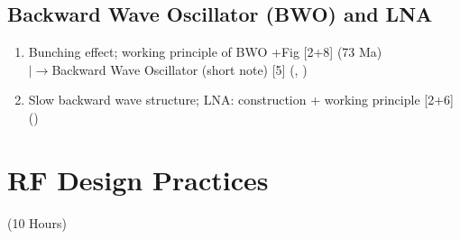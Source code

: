 \documentclass[12pt]{article}
\newcommand{\lb}{\\$\left|\rightarrow\right.$}
\begin{document}
  \subsection{Backward Wave Oscillator (BWO) and LNA}
    \begin{enumerate}[topsep=0pt, noitemsep]
      \item Bunching effect; working principle of BWO +Fig \hfill [2+8] (73 Ma)
        \lb Backward Wave Oscillator (short note) \hfill [5] (, )
      \item Slow backward wave structure; LNA: construction + working principle \hfill [2+6] ()
    \end{enumerate}

\pagebreak
\section{RF Design Practices}
\begin{center}(10 Hours)\end{center}
\end{document}
